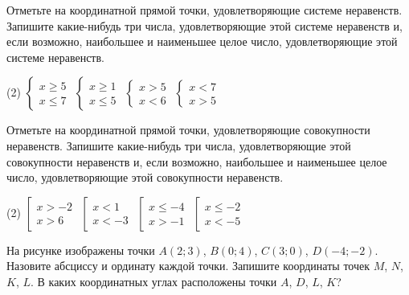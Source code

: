 \begin{class}[number=1]
\begin{listofex}
\begin{tasks}
		\end{tasks}
		\item Отметьте на координатной прямой точки, удовлетворяющие системе неравенств. Запишите какие-нибудь три числа, удовлетворяющие этой системе неравенств и, если возможно, наибольшее и наименьшее целое число, удовлетворяющие этой системе неравенств.
		\begin{tasks}(2)
			\task \( \begin{cases} x \ge 5 \\ x \le 7 \end{cases} \)
			\task \( \begin{cases} x \ge 1 \\ x \le 5 \end{cases} \)
			\task \( \begin{cases} x>5 \\ x<6 \end{cases} \)
			\task \( \begin{cases} x<7 \\ x>5 \end{cases} \)
		\end{tasks}
		\item Отметьте на координатной прямой точки, удовлетворяющие совокупности неравенств. Запишите какие-нибудь три числа, удовлетворяющие этой совокупности неравенств и, если возможно, наибольшее и наименьшее целое число, удовлетворяющие этой совокупности неравенств.
		\begin{tasks}(2)
			\task \( \left[ 
			\begin{array}{l}
				x>-2\\
				x>6
			\end{array}
			\right. \)
			\task \( \left[
			\begin{array}{l} x<1 \\ x<-3 \end{array} \right. \)
			\task \( \left[
			\begin{array}{l} x \le -4 \\ x>-1 \end{array} \right. \)
			\task \( \left[
			\begin{array}{l} x \le -2 \\ x < -5 \end{array} \right. \)
		\end{tasks}
		\item 	
		\begin{minipage}[c]{0.6\linewidth}
				На рисунке изображены точки \( A (2;3) \), \( B(0;4) \), \( C(3;0) \), \( D(-4;-2) \). Назовите абсциссу и ординату каждой точки. Запишите координаты точек \( M \), \( N \), \( K \), \( L \). В каких координатных углах расположены точки \( A \), \( D \), \( L \), \( K \)?

\end{minipage}
\end{listofex}
\end{class}
